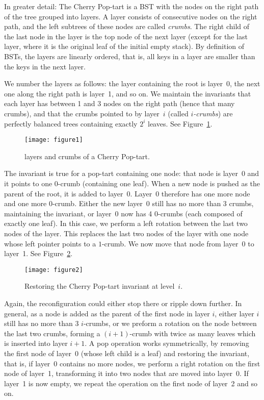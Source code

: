 \documentclass[11pt]{article}
\begin{document}
In greater detail: The Cherry Pop-tart is a BST with the nodes on the
right path of the tree grouped into layers. A layer consists of
consecutive nodes on the right path, and the left subtrees of these
nodes are called \emph{crumbs}. The right child of the last node in the
layer is the top node of the next layer (except for the last layer,
where it is the original leaf of the initial empty stack). By definition
of BSTs, the layers are linearly ordered, that is, all keys in a layer
are smaller than the keys in the next layer.

We number the layers as follows: the layer containing the root is
layer~0, the next one along the right path is layer~1, and so on.  We
maintain the invariants that each layer has between 1 and 3 nodes on the
right path (hence that many crumbs), and that the crumbs pointed to by
layer~$i$ (called \emph{$i$-crumbs}) are perfectly balanced trees
containing exactly $2^i$ leaves. See Figure~\ref{fig:cherry-pop-tart}.
\begin{figure}
\begin{center}
\texttt{[image: figure1]} 
\end{center}
\caption{layers and crumbs of a Cherry Pop-tart.}
\label{fig:cherry-pop-tart}
\end{figure}

The invariant is true for a pop-tart containing one node: that node is
layer~0 and it points to one $0$-crumb (containing one leaf). When a new
node is pushed as the parent of the root, it is added to
layer~0. Layer~0 therefore has one more node and one more
$0$-crumb. Either the new layer~0 still has no more than 3 crumbs,
maintaining the invariant, or layer~0 now has 4 $0$-crumbs (each
composed of exactly one leaf). In this case, we perform a left rotation
between the last two nodes of the layer. This replaces the last two
nodes of the layer with one node whose left pointer points to a
$1$-crumb. We now move that node from layer~0 to layer~1. See
Figure~\ref{fig:cherry-pop-tart-rot}.
\begin{figure}
\begin{center}
\texttt{[image: figure2]} 
\end{center}
\caption{Restoring the Cherry Pop-tart invariant at level~$i$.}
\label{fig:cherry-pop-tart-rot}
\end{figure} 
Again, the reconfiguration could either stop there or ripple down
further.  In general, as a node is added as the parent of the first node
in layer $i$, either layer $i$ still has no more than 3
$i$-crumbs, or we preform a rotation on the node between the last two
crumbs, forming a $(i+1)$-crumb with twice as many leaves which is
inserted into layer $i+1$. A pop operation works symmetrically, by
removing the first node of layer~0 (whose left child is a leaf) and
restoring the invariant, that is, if layer~0 contains no more nodes,
we perform a right rotation on the first node of layer~1, transforming
it into two nodes that are moved into layer~0.  If layer~1 is now empty,
we repeat the operation on the first node of layer~2 and so on.
\end{document}
